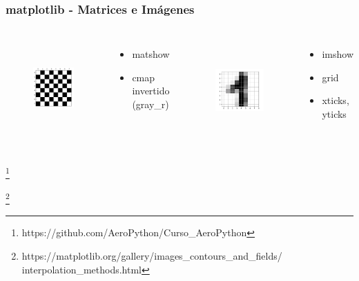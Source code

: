 \documentclass[18pt]{beamer}
\newcommand\blfootnote[1]{%
  \begingroup
  \renewcommand\thefootnote{}\footnote{#1}%
  \addtocounter{footnote}{-1}%
  \endgroup
}
\begin{document}
\begin{frame}
	
	\frametitle{matplotlib - Matrices e Imágenes}
	
	\vspace{-1.5cm}	
	
	\begin{columns}

			\centering
			\begin{figure}
				\includegraphics[height=3.8cm]{images/matplotlib_matshow.png}
			\end{figure}

			\vspace{-0.3cm}
			\begin{itemize}
				\item matshow
				\item cmap invertido (gray\_r)
			\end{itemize}
									
			
			\vspace{0.6cm}
			\begin{figure}
				\includegraphics[height=4.0cm]{images/matplotlib_imshow.png}
			\end{figure}
			
			\vspace{-0.4cm}
			\begin{itemize}
				\item imshow
				\item grid
				\item xticks, yticks
			\end{itemize}

	\end{columns}

	\vspace{-2cm}	
	
	\blfootnote{\scriptsize https://github.com/AeroPython/Curso\_AeroPython}	
	
	\blfootnote{\scriptsize https://matplotlib.org/gallery/images\_contours\_and\_fields/
	interpolation\_methods.html}
	
\end{frame}
\end{document}
